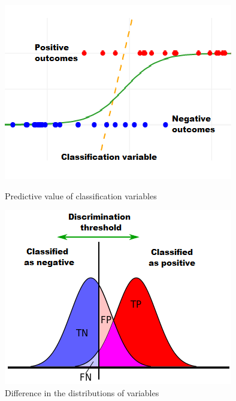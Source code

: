 


\begin{figure}
        \begin{minipage}[b]{0.45\linewidth}
            \centering
            \includegraphics[width=\textwidth]{Figs/Classification/LogisticReg_5.png}
            \caption{Predictive value of classification variables}
        \end{minipage}
        \hspace{0.5cm}
        \begin{minipage}[b]{0.45\linewidth}
            \centering
            \includegraphics[width=\textwidth]{Figs/Classification/ROC_distns_1.png}
            \caption{Difference in the distributions of variables}
        \end{minipage}
\end{figure}




